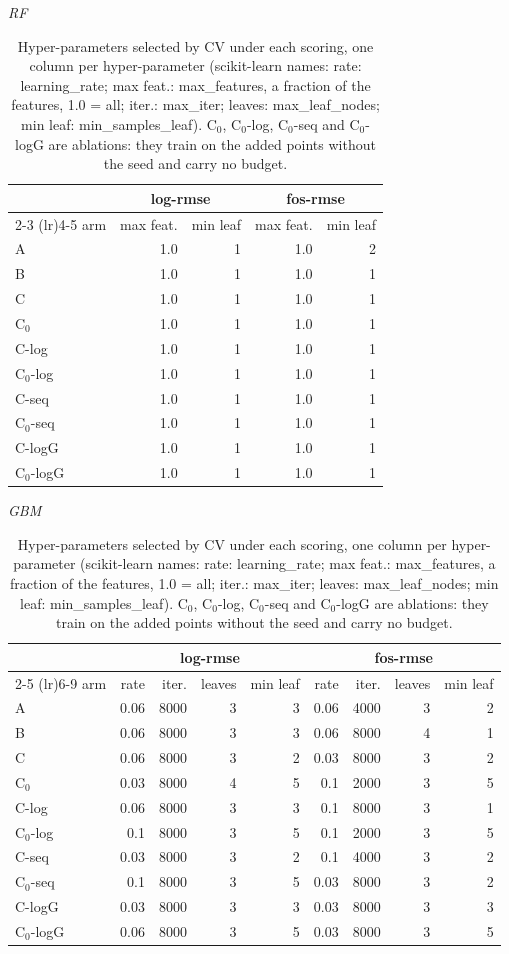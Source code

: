 \begin{table}[htbp]
\centering
\caption{Hyper-parameters selected by CV under each scoring, one column per hyper-parameter (scikit-learn names: rate: learning\_rate; max feat.: max\_features, a fraction of the features, 1.0 = all; iter.: max\_iter; leaves: max\_leaf\_nodes; min leaf: min\_samples\_leaf). C$_0$, C$_0$-log, C$_0$-seq and C$_0$-logG are ablations: they train on the added points without the seed and carry no budget.}
\label{tab:scorings:params}
\textit{RF}\par\smallskip
\begin{tabular}{lrrrr}
\toprule
 & \multicolumn{2}{c}{log-rmse} & \multicolumn{2}{c}{fos-rmse} \\
\cmidrule(lr){2-3} \cmidrule(lr){4-5}
arm & max feat. & min leaf & max feat. & min leaf \\
\midrule
A & 1.0 & 1 & 1.0 & 2 \\
B & 1.0 & 1 & 1.0 & 1 \\
C & 1.0 & 1 & 1.0 & 1 \\
C$_0$ & 1.0 & 1 & 1.0 & 1 \\
C-log & 1.0 & 1 & 1.0 & 1 \\
C$_0$-log & 1.0 & 1 & 1.0 & 1 \\
C-seq & 1.0 & 1 & 1.0 & 1 \\
C$_0$-seq & 1.0 & 1 & 1.0 & 1 \\
C-logG & 1.0 & 1 & 1.0 & 1 \\
C$_0$-logG & 1.0 & 1 & 1.0 & 1 \\
\bottomrule
\end{tabular}
\par\medskip
\textit{GBM}\par\smallskip
\begin{tabular}{lrrrrrrrr}
\toprule
 & \multicolumn{4}{c}{log-rmse} & \multicolumn{4}{c}{fos-rmse} \\
\cmidrule(lr){2-5} \cmidrule(lr){6-9}
arm & rate & iter. & leaves & min leaf & rate & iter. & leaves & min leaf \\
\midrule
A & 0.06 & 8000 & 3 & 3 & 0.06 & 4000 & 3 & 2 \\
B & 0.06 & 8000 & 3 & 3 & 0.06 & 8000 & 4 & 1 \\
C & 0.06 & 8000 & 3 & 2 & 0.03 & 8000 & 3 & 2 \\
C$_0$ & 0.03 & 8000 & 4 & 5 & 0.1 & 2000 & 3 & 5 \\
C-log & 0.06 & 8000 & 3 & 3 & 0.1 & 8000 & 3 & 1 \\
C$_0$-log & 0.1 & 8000 & 3 & 5 & 0.1 & 2000 & 3 & 5 \\
C-seq & 0.03 & 8000 & 3 & 2 & 0.1 & 4000 & 3 & 2 \\
C$_0$-seq & 0.1 & 8000 & 3 & 5 & 0.03 & 8000 & 3 & 2 \\
C-logG & 0.03 & 8000 & 3 & 3 & 0.03 & 8000 & 3 & 3 \\
C$_0$-logG & 0.06 & 8000 & 3 & 5 & 0.03 & 8000 & 3 & 5 \\
\bottomrule
\end{tabular}
\end{table}
